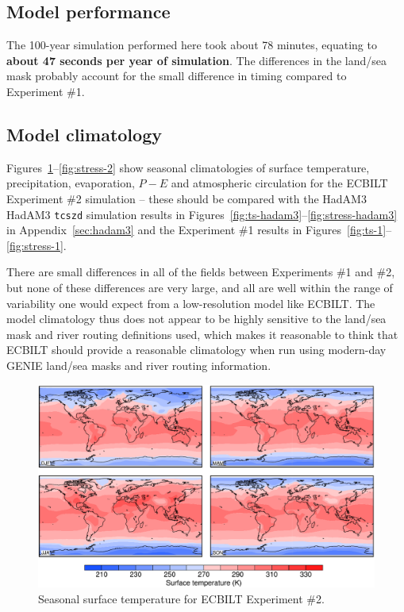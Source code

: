 \documentclass[a4paper,11pt]{article}
\begin{document}
\subsection{Model performance}

The 100-year simulation performed here took about 78 minutes, equating
to \textbf{about 47 seconds per year of simulation}.  The differences
in the land/sea mask probably account for the small difference in
timing compared to Experiment \#1.

\subsection{Model climatology}

Figures~\ref{fig:ts-2}--\ref{fig:stress-2} show seasonal climatologies
of surface temperature, precipitation, evaporation, $P-E$ and
atmospheric circulation for the ECBILT Experiment \#2 simulation --
these should be compared with the HadAM3 HadAM3 \texttt{tcszd}
simulation results in
Figures~\ref{fig:ts-hadam3}--\ref{fig:stress-hadam3} in
Appendix~\ref{sec:hadam3} and the Experiment \#1 results in
Figures~\ref{fig:ts-1}--\ref{fig:stress-1}.

There are small differences in all of the fields between Experiments
\#1 and \#2, but none of these differences are very large, and all are
well within the range of variability one would expect from a
low-resolution model like ECBILT.  The model climatology thus does not
appear to be highly sensitive to the land/sea mask and river routing
definitions used, which makes it reasonable to think that ECBILT
should provide a reasonable climatology when run using modern-day
GENIE land/sea masks and river routing information.

\begin{figure}
  \begin{center}
    \includegraphics[width=\textwidth]{../expt-2/plots/ts-plots}
  \end{center}
  \caption{Seasonal surface temperature for ECBILT Experiment \#2.}
  \label{fig:ts-2}
\end{figure}
\end{document}
